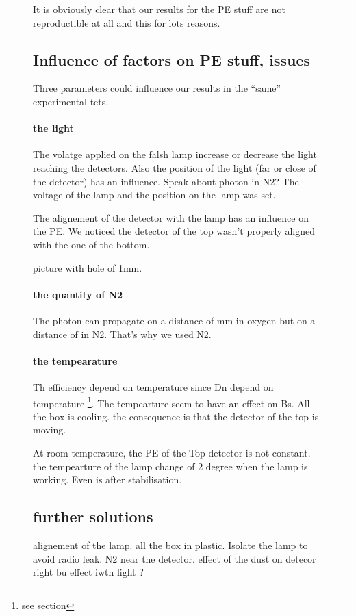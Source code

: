 \documentclass[a4paper, 11pt]{report}%
\begin{document}
\begin{figure}[!hbtp]
  It is obviously  clear that our results for  the PE stuff are not reproductible at all and this for lots reasons.
  
  \subsection{Influence of factors on PE stuff, issues}
  
  Three parameters could influence our results in the ``same'' experimental tets.
  
  \paragraph{the light}
  
  The volatge applied on the falsh lamp increase or decrease the light reaching the detectors. Also the position of the light (far or close of 
  the detector) has an influence. Speak about photon in N2? 
  The voltage of the lamp and the position on the lamp was set. 
  
  
  The alignement of the detector with the lamp has an influence on the PE. We noticed the detector of the top wasn't properly aligned with the 
  one of the bottom. 
  
  picture with hole of 1mm. 
  
  \paragraph{the quantity of N2}
  
  The photon can propagate on a distance of mm  in oxygen but on a distance of in N2. That's why we used N2. 
  
  \paragraph{the tempearature}
  
  Th efficiency depend on temperature since Dn depend on temperature \footnote{see section}. 
  The tempearture seem to have an effect on Bs. All the box is cooling. the consequence is that the detector of the top is moving. 
  
  At room temperature, the PE of the Top detector is not constant. the tempearture of the lamp change of 2 degree when the lamp is working. 
  Even is after stabilisation.
  
  
  
  \subsection{further solutions}
  alignement of the lamp. all the box in plastic. Isolate the lamp to avoid radio leak. N2 near the detector. 
  effect of the dust on detecor right bu effect iwth light ? 
  

\end{figure}
\end{document}
